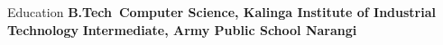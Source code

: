 \begin{noprefixrubric}{Education}
\entry*[2022-2026]%
	\textbf{B.Tech~Computer Science, Kalinga Institute of Industrial Technology}
%
\entry*[2022]%
	\textbf{Intermediate, Army Public School Narangi}
% 
\end{noprefixrubric}
